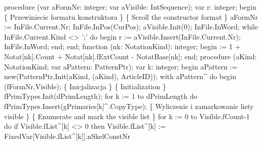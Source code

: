procedure (var aFormNr: integer; var aVisible: IntSequence);
var
   r: integer;
begin
   \{ Przewiniecie formatu konstruktora \}
   \{ Scroll the constructor format \}
   aFormNr := InFile.Current.Nr;
   InFile.InPos(CurPos);
   aVisible.Init(0);
   InFile.InWord;
   while InFile.Current.Kind <> ';' do
   begin
      r := aVisible.Insert(InFile.Current.Nr);
      InFile.InWord;
   end;
end;
\eatline
{}\nwendcode{}\nwdocspar
\nwenddocs{}\endmoddef\nwstartdeflinemarkup{}\nwenddeflinemarkup
function (nk: NotationKind): integer;
begin
   :=  1 + Notat[nk].Count +  Notat[nk].fExtCount - NotatBase[nk];
end;
\eatline
{}\nwendcode{}\nwdocspar
\nwenddocs{}\endmoddef\nwstartdeflinemarkup{}\nwenddeflinemarkup
procedure (aKind: NotationKind; var aPattern: PatternPtr);
var
   k: integer;
begin
   aPattern := new(PatternPtr,Init(aKind, (aKind), ArticleID));
   with aPattern^ do
   begin
      (fFormNr,Visible);
      \{ Inicjalizacja \} \{ Initialization \}
      fPrimTypes.Init(dPrimLength);
      for k := 1 to dPrimLength do
         fPrimTypes.Insert(gPrimaries[k]^.CopyType);
      \{ Wyliczenie i zamarkowanie listy visible \}
      \{ Enumerate and mark the visible list \}
      for k := 0 to Visible.fCount-1 do
         if Visible.fList^[k] <> 0 then
            Visible.fList^[k] := FixedVar[Visible.fList^[k]].nSkelConstNr
